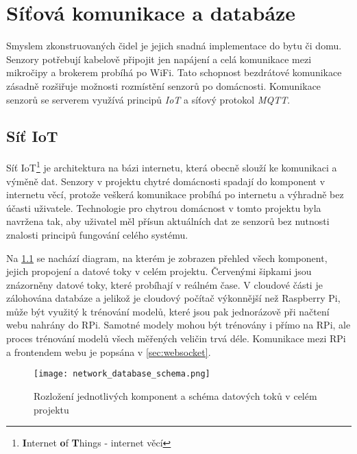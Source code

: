 \chapter{Síťová komunikace a databáze} \label{chap:methods}
Smyslem zkonstruovaných čidel je jejich snadná implementace do bytu či domu. Senzory potřebují kabelově připojit jen napájení a celá komunikace mezi mikročipy a brokerem probíhá po WiFi. Tato schopnost bezdrátové komunikace zásadně rozšiřuje možnosti rozmístění senzorů po domácnosti. Komunikace senzorů se serverem využívá principů \textit{IoT} a síťový protokol \textit{MQTT}. 

\section*{Síť IoT} \label{sec:iot}
Síť IoT\footnote{\textbf{I}nternet \textbf{o}f \textbf{T}hings - internet věcí} je architektura na bázi internetu, která obecně slouží ke komunikaci a výměně dat. Senzory v projektu chytré domácnosti spadají do komponent v internetu věcí, protože veškerá komunikace probíhá po internetu a výhradně bez účasti uživatele. Technologie pro chytrou domácnost v tomto projektu byla navržena tak, aby uživatel měl přísun aktuálních dat ze senzorů bez nutnosti znalosti principů fungování celého systému. \par
Na \cref{fig:network_database_schema} se nachází diagram, na kterém je zobrazen přehled všech komponent, jejich propojení a datové toky v celém projektu. Červenými šipkami jsou znázorněny datové toky, které probíhají v reálném čase. V cloudové části je zálohována databáze a jelikož je cloudový počítač výkonnější než Raspberry Pi, může být využitý k trénování modelů, které jsou pak jednorázově při načtení webu nahrány do RPi. Samotné modely mohou být trénovány i přímo na RPi, ale proces trénování modelů všech měřených veličin trvá déle. Komunikace mezi RPi a frontendem webu je popsána v \cref{sec:websocket}.

\begin{figure}[H]
  \centering
  \texttt{[image: network\_database\_schema.png]}
  \caption{Rozložení jednotlivých komponent a schéma datových toků v celém projektu}
  \label{fig:network_database_schema}
\end{figure}

